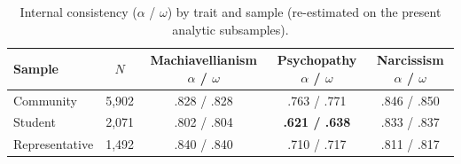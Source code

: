 \documentclass[11pt,twocolumn]{article}
\begin{document}
\begin{table}[!t]
\centering
\caption{Internal consistency ($\alpha$ / $\omega$) by trait and sample (re-estimated on the present analytic subsamples).}
\label{tab:alpha}
\small
\begin{tabular}{lcccc}
\toprule
Sample & $N$ & Machiavellianism $\alpha$ / $\omega$ & Psychopathy $\alpha$ / $\omega$ & Narcissism $\alpha$ / $\omega$ \\
\midrule
Community      & 5{,}902 & .828 / .828 & .763 / .771 & .846 / .850 \\
Student        & 2{,}071 & .802 / .804 & \textbf{.621 / .638} & .833 / .837 \\
Representative & 1{,}492 & .840 / .840 & .710 / .717 & .811 / .817 \\
\bottomrule
\end{tabular}
\end{table}
\end{document}
